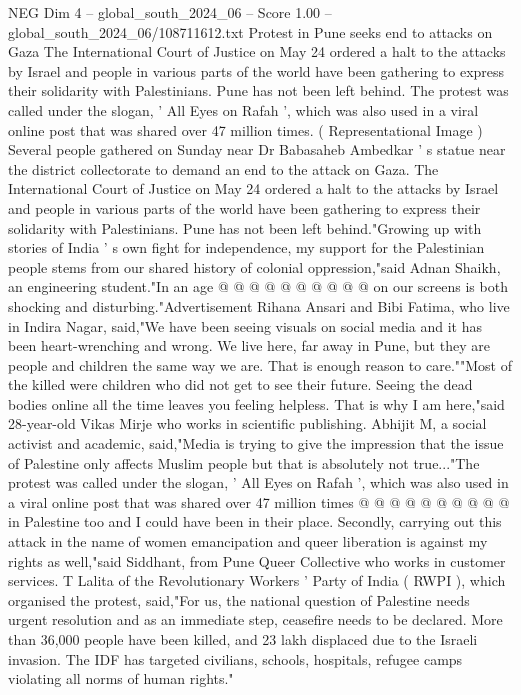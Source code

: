\begin{textsample}{NEG Dim 4 – global\_south\_2024\_06 – Score 1.00 – global\_south\_2024\_06/108711612.txt}  \label{ex:f4_neg_371}
Protest in Pune seeks end to attacks on Gaza The International Court of Justice on May 24 ordered a halt to the attacks by Israel and people in various parts of the world have been gathering to express their solidarity with Palestinians.
Pune has not been left behind.
The protest was called under the slogan, ' All Eyes on Rafah ', which was also used in a viral online post that was shared over 47 million times. ( Representational Image ) Several people gathered on Sunday near Dr Babasaheb Ambedkar ' s statue near the district collectorate to demand an end to the attack on Gaza.
The International Court of Justice on May 24 ordered a halt to the attacks by Israel and people in various parts of the world have been gathering to express their solidarity with Palestinians.
Pune has not been left behind."Growing up with stories of India ' s own fight for independence, my support for the Palestinian people stems from our shared history of colonial oppression,"said Adnan Shaikh, an engineering student."In an age @ @ @ @ @ @ @ @ @ @ on our screens is both shocking and disturbing."Advertisement Rihana Ansari and Bibi Fatima, who live in Indira Nagar, said,"We have been seeing visuals on social media and it has been heart-wrenching and wrong.
We live here, far away in Pune, but they are people and children the same way we are.
That is enough reason to care.""Most of the killed were children who did not get to see their future.
Seeing the dead bodies online all the time leaves you feeling helpless.
That is why I am here,"said 28-year-old Vikas Mirje who works in scientific publishing.
Abhijit M, a social activist and academic, said,"Media is trying to give the impression that the issue of Palestine only affects Muslim people but that is absolutely not true..."The protest was called under the slogan, ' All Eyes on Rafah ', which was also used in a viral online post that was shared over 47 million times @ @ @ @ @ @ @ @ @ @ in Palestine too and I could have been in their place.
Secondly, carrying out this attack in the name of women emancipation and queer liberation is against my rights as well,"said Siddhant, from Pune Queer Collective who works in customer services.
T Lalita of the Revolutionary Workers ' Party of India ( RWPI ), which organised the protest, said,"For us, the national question of Palestine needs urgent resolution and as an immediate step, ceasefire needs to be declared.
More than 36,000 people have been killed, and 23 lakh displaced due to the Israeli invasion.
The IDF has targeted civilians, schools, hospitals, refugee camps violating all norms of human rights."

\end{textsample}
